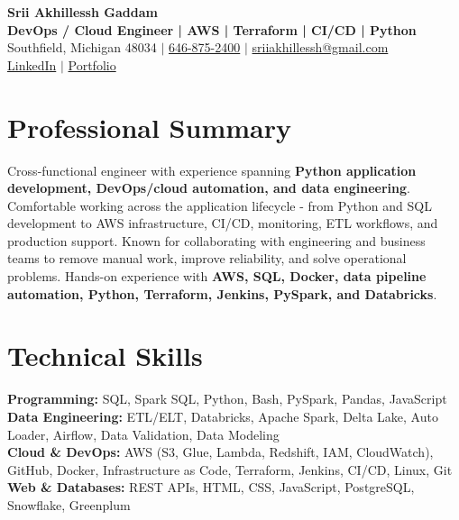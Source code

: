 \documentclass[letterpaper,10pt]{article}
\begin{document}
\fontsize{9.35pt}{10.45pt}\selectfont

\begin{center}
    {\LARGE \textbf{Srii Akhillessh Gaddam}} \\[-1pt]
    \textbf{DevOps / Cloud Engineer | AWS | Terraform | CI/CD | Python} \\[2pt]
    Southfield, Michigan 48034 $|$
    \href{tel:6468752400}{646-875-2400} $|$
    \href{mailto:sriiakhillessh@gmail.com}{sriiakhillessh@gmail.com} \\[1pt]
    \href{https://www.linkedin.com/in/srii-akhiilessh-gaddam-b48668191/}{LinkedIn} $|$
    \href{https://sriiakhillesshg.github.io/portfolio/}{Portfolio}
\end{center}
\vspace{-8pt}

\section{Professional Summary}
\small{Cross-functional engineer with experience spanning \textbf{Python application development, DevOps/cloud automation, and data engineering}. Comfortable working across the application lifecycle - from Python and SQL development to AWS infrastructure, CI/CD, monitoring, ETL workflows, and production support. Known for collaborating with engineering and business teams to remove manual work, improve reliability, and solve operational problems. Hands-on experience with \textbf{AWS, SQL, Docker, data pipeline automation, Python, Terraform, Jenkins, PySpark, and Databricks}.}

\section{Technical Skills}
\small{
\textbf{Programming:} SQL, Spark SQL, Python, Bash, PySpark, Pandas, JavaScript \\
\textbf{Data Engineering:} ETL/ELT, Databricks, Apache Spark, Delta Lake, Auto Loader, Airflow, Data Validation, Data Modeling \\
\textbf{Cloud \& DevOps:} AWS (S3, Glue, Lambda, Redshift, IAM, CloudWatch), GitHub, Docker, Infrastructure as Code, Terraform, Jenkins, CI/CD, Linux, Git \\
\textbf{Web \& Databases:} REST APIs, HTML, CSS, JavaScript, PostgreSQL, Snowflake, Greenplum
}
\end{document}
